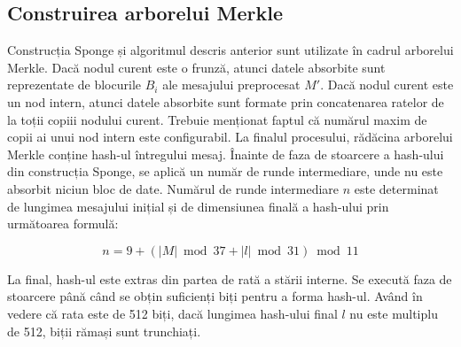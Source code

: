 \subsection{Construirea arborelui Merkle}
Construcția Sponge și algoritmul descris anterior sunt utilizate în cadrul arborelui Merkle.
Dacă nodul curent este o frunză, atunci datele absorbite sunt reprezentate de blocurile $B_i$ ale mesajului preprocesat $M'$.
Dacă nodul curent este un nod intern, atunci datele absorbite sunt formate prin concatenarea ratelor de la toții copiii nodului curent.
Trebuie menționat faptul că numărul maxim de copii ai unui nod intern este configurabil.
La finalul procesului, rădăcina arborelui Merkle conține hash-ul întregului mesaj.
Înainte de faza de stoarcere a hash-ului din construcția Sponge, se aplică un număr de runde intermediare, unde nu este absorbit niciun bloc de date.
Numărul de runde intermediare $n$ este determinat de lungimea mesajului inițial și de dimensiunea finală a hash-ului prin următoarea formulă:

\begin{equation}
    n = 9 + (|M| \bmod 37 + |l| \bmod 31) \bmod 11
\end{equation}

La final, hash-ul este extras din partea de rată a stării interne.
Se execută faza de stoarcere până când se obțin suficienți biți pentru a forma hash-ul.
Având în vedere că rata este de 512 biți, dacă lungimea hash-ului final $l$ nu este multiplu de 512, biții rămași sunt trunchiați.